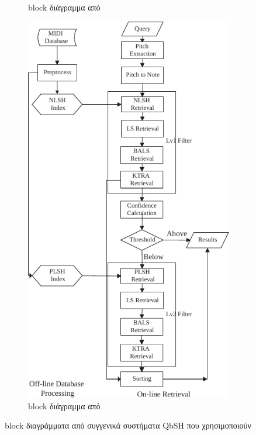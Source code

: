 \begin{figure}[htb]
\begin{subfigure}[t]{0.3\linewidth}
        \caption{block διάγραμμα από \protect\cite{guo2012query}}
        \label{fig:guo2012query}
    \end{subfigure}\hfill
    \begin{subfigure}[t]{0.3\linewidth}
        \includegraphics[width=\linewidth]{guo2013query}
        \caption{block διάγραμμα από \protect\cite{guo2013query}}
        \label{fig:guo2013query}
    \end{subfigure}
    \caption{block διαγράμματα από συγγενικά συστήματα QbSH που χρησιμοποιούν \lsh{}}
    \label{fig:many-lsb-blocks}
\end{figure}

